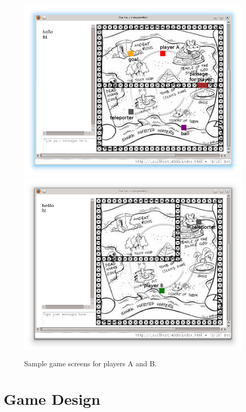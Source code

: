

\begin{figure}
\includegraphics[scale=0.4]{player1_new_with_label.png} 
\includegraphics[scale=0.4]{player2_new_with_label.png}
\caption{Sample game screens for players A and B.}
\label{fig:player-screenshots}
\end{figure}

\section{Game Design}


